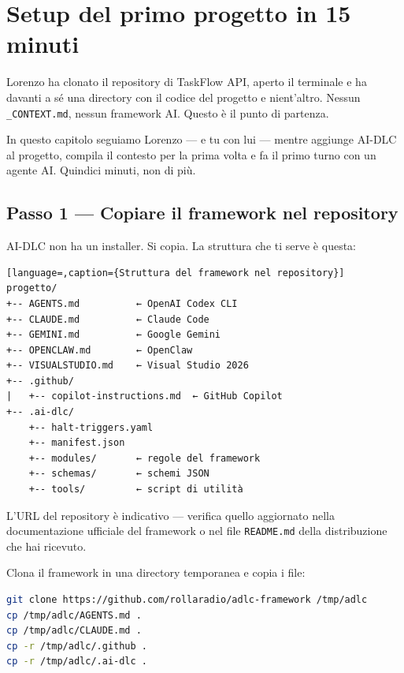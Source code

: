 ﻿%

\chapter{Setup del primo progetto in 15 minuti}
\label{ch:setup-primo-progetto}

Lorenzo ha clonato il repository di TaskFlow API, aperto il terminale e ha davanti a sé una directory con il codice del progetto e nient'altro. Nessun \texttt{\_CONTEXT.md}, nessun framework AI. Questo è il punto di partenza.

In questo capitolo seguiamo Lorenzo --- e tu con lui --- mentre aggiunge AI-DLC al progetto, compila il contesto per la prima volta e fa il primo turno con un agente AI. Quindici minuti, non di più.

\section{Passo 1 --- Copiare il framework nel repository}
\label{sec:02-passo1-copia}

AI-DLC non ha un installer. Si copia. La struttura che ti serve è questa:

\begin{lstlisting}[language=,caption={Struttura del framework nel repository}]
progetto/
+-- AGENTS.md          ← OpenAI Codex CLI
+-- CLAUDE.md          ← Claude Code
+-- GEMINI.md          ← Google Gemini
+-- OPENCLAW.md        ← OpenClaw
+-- VISUALSTUDIO.md    ← Visual Studio 2026
+-- .github/
|   +-- copilot-instructions.md  ← GitHub Copilot
+-- .ai-dlc/
    +-- halt-triggers.yaml
    +-- manifest.json
    +-- modules/       ← regole del framework
    +-- schemas/       ← schemi JSON
    +-- tools/         ← script di utilità
\end{lstlisting}

\begin{notebox}
L'URL del repository è indicativo --- verifica quello aggiornato nella documentazione ufficiale del framework o nel file \texttt{README.md} della distribuzione che hai ricevuto.
\end{notebox}

Clona il framework in una directory temporanea e copia i file:

\begin{lstlisting}[language=bash,caption={Installazione su Bash (Linux/macOS/WSL)}]
git clone https://github.com/rollaradio/adlc-framework /tmp/adlc
cp /tmp/adlc/AGENTS.md .
cp /tmp/adlc/CLAUDE.md .
cp -r /tmp/adlc/.github .
cp -r /tmp/adlc/.ai-dlc .
\end{lstlisting}

